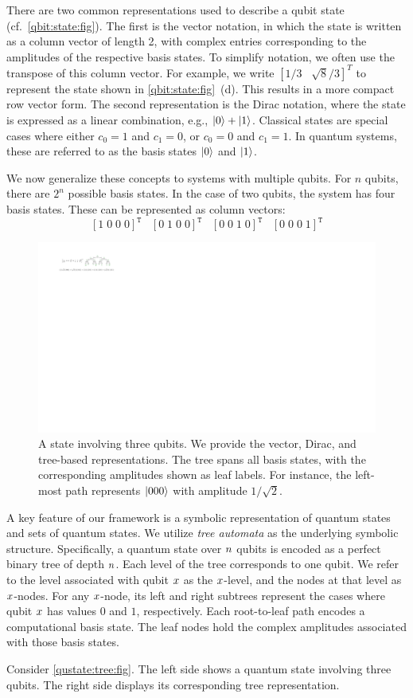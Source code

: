 There are two common representations used to describe a qubit state (cf.\ \cref{qbit:state:fig}).
%
The first is the vector notation, in which the state is written as a column vector of length 2, with complex entries corresponding to the amplitudes of the respective basis states.
%
To simplify notation, we often use the transpose of this column vector.
%
For example, we write $[1/3\;\;\;\sqrt{8}/3]^T$ to represent the state shown in \cref{qbit:state:fig}~(d).
%
This results in a more compact row vector form.
%
The second representation is the Dirac notation, where the state is expressed as a linear combination, e.g., $|0\rangle + |1\rangle$.
%
Classical states are special cases where either $c_0 = 1$ and $c_1 = 0$, or $c_0 = 0$ and $c_1 = 1$.
%
In quantum systems, these are referred to as the basis states $|0\rangle$ and $|1\rangle$.

We now generalize these concepts to systems with multiple qubits.
%
For $n$ qubits, there are $2^n$ possible basis states.
%
%
In the case of two qubits, the system has four basis states.
%
These can be represented as column vectors:
\[
\left[
1\;0\;0\;0
\right]^{\mathtt T}
\;\;\;
\left[
0\;1\;0\;0
\right]^{\mathtt T}
\;\;\;
\left[
0\;0\;1\;0
\right]^{\mathtt T}
\;\;\;
\left[
0\;0\;0\;1
\right]^{\mathtt T}
\]

\begin{figure}
\includegraphics[scale=1]{figures/States/state3}
\caption{A state involving three qubits.  We provide the vector, Dirac, and tree-based representations.
%
The tree spans all basis states, with the corresponding amplitudes shown as leaf labels.
%
For instance, the left-most path represents $|000\rangle$ with amplitude $1/\sqrt{2}$.
}
\label{triple:qbit:state:fig}
\end{figure}


A key feature of our framework is a symbolic representation of quantum states and sets of quantum states.
%
We utilize {\it tree automata} as the underlying symbolic structure.
%
Specifically, a quantum state over $n$ qubits is encoded as a perfect binary tree of depth $n$.
%
Each level of the tree corresponds to one qubit.
%
We refer to the level associated with qubit $x$ as the $x$-level, and the nodes at that level as $x$-nodes.
%
For any $x$-node, its left and right subtrees represent the cases where qubit $x$ has values $0$ and $1$, respectively.
%
Each root-to-leaf path encodes a computational basis state.
%
The leaf nodes hold the complex amplitudes associated with those basis states.

Consider \cref{qustate:tree:fig}.
%
The left side shows a quantum state involving three qubits.
%
The right side displays its corresponding tree representation.
%

